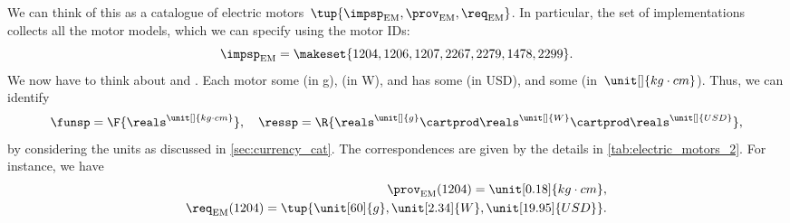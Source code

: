 \begin{example}
    We can think of this as a catalogue of electric motors~$\tup{\impsp_\mathrm{EM},\prov_\mathrm{EM},\req_\mathrm{EM}}$.
    In particular, the set of implementations collects all the motor models, which we can specify using the motor IDs:
    \begin{equation}
        \impsp_\mathrm{EM}=\makeset{1204,1206,1207,2267,2279,1478,2299 }.
    \end{equation}
    We now have to think about  and .
    Each motor  some  (in \unit[]{g}),  (in \unit[]{W}), and has some  (in USD), and  some  (in~$\unit[]{kg\cdot cm}$).
    Thus, we can identify
    \begin{equation}
        \funsp =\F{\reals^{\unit[]{kg\cdot cm}}},\quad \ressp=\R{\reals^{\unit[]{g}}\cartprod \reals^{\unit[]{W}}\cartprod \reals^{\unit[]{USD}}},
    \end{equation}
    by considering the units as discussed in \cref{sec:currency_cat}.
    The correspondences are given by the details in \cref{tab:electric_motors_2}.
    For instance, we have
    \begin{align}
        \prov_\mathrm{EM}(1204)=\unit[0.18]{kg\cdot cm}, \\ \req_\mathrm{EM}(1204)=\tup{\unit[60]{g},\unit[2.34]{W},\unit[19.95]{USD}}.
    \end{align}


\end{example}
